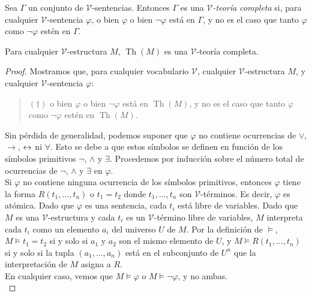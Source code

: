 \message{ !name(main.tex)}\documentclass[12pt,a4paper]{book}
\newcommand{\VV}{\mathcal{V}}
\DeclareMathOperator{\Th}{Th}
\begin{document}
    \begin{definicion}\label{def:teoria-completa}
        Sea $\Gamma$ un conjunto de $\VV$-sentencias. Entonces $\Gamma$ es una \textit{$\VV$-teoría completa} si, para
        cualquier $\VV$-sentencia $\varphi$, o bien $\varphi$ o bien $\neg\varphi$ está en $\Gamma$, y no es el caso que
        tanto $\varphi$ como $\neg\varphi$ estén en $\Gamma$.
    \end{definicion}

    \begin{proposicion}\label{prop:teoria-completa-de-estructura}
        Para cualquier $\VV$-estructura $M$, $\Th(M)$ es una $\VV$-teoría completa.
    \end{proposicion}
    \begin{proof}
        Mostramos que, para cualquier vocabulario $\VV$, cualquier $\VV$-estructura $M$, y cualquier $\VV$-sentencia
        $\varphi$:
        \begin{quote}
            $(\dagger)$ o bien $\varphi$ o bien $\neg\varphi$ está en $\Th(M)$, y no es el caso que tanto $\varphi$ como
            $\neg\varphi$ estén en $\Th(M)$.
        \end{quote}
        Sin pérdida de generalidad, podemos suponer que $\varphi$ no contiene ocurrencias de $\vee$, $\rightarrow$, $\leftrightarrow$
        ni $\forall$. Esto se debe a que estos símbolos se definen en función de los símbolos primitivos $\neg$, $\wedge$
        y $\exists$. Procedemos por inducción sobre el número total de ocurrencias de $\neg$, $\wedge$ y $\exists$ en
        $\varphi$.\\
        Si $\varphi$ no contiene ninguna ocurrencia de los símbolos primitivos, entonces $\varphi$ tiene la forma
        $R(t_{1},\dots,t_{n})$ o $t_{1}=t_{2}$ donde $t_{1},\dots,t_{n}$ son $\VV$-términos. Es decir, $\varphi$ es
        atómica. Dado que $\varphi$ es una sentencia, cada $t_{i}$ está libre de variables. Dado que $M$ es una
        $\VV$-estructura y cada $t_{i}$ es un $\VV$-término libre de variables, $M$ interpreta cada $t_{i}$ como un
        elemento $a_{i}$ del universo $U$ de $M$. Por la definición de $\models$, $M\models t_{1}=t_{2}$ si y solo si
        $a_{1}$ y $a_{2}$ son el mismo elemento de $U$, y $M\models R(t_{1},\dots,t_{n})$ si y solo si la tupla
        $(a_{1},\dots,a_{n})$ está en el subconjunto de $U^{n}$ que la interpretación de $M$ asigna a $R$.\\
        En cualquier caso, vemos que $M\models\varphi$ o $M\models\neg\varphi$, y no ambas.\\

\end{proof}
\end{document}
